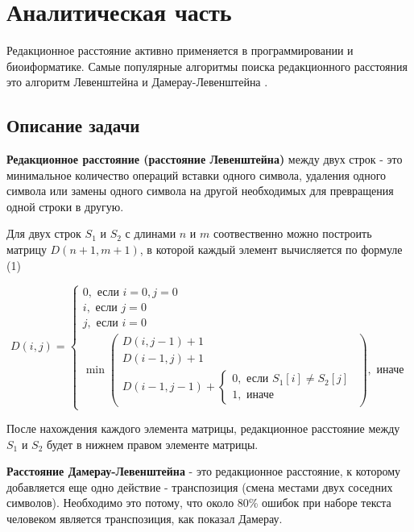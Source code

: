 \newpage
\section{Аналитическая часть}

Редакционное расстояние активно применяется в программировании и биоиформатике.
Самые популярные алгоритмы поиска редакционного расстояния это алгоритм
Левенштейна и Дамерау-Левенштейна \cite{habr}.

\subsection{Описание задачи}

\textbf{Редакционное расстояние (расстояние Левенштейна)}
между двух строк - это
минимальное количество операций вставки одного символа, удаления одного
символа или замены одного символа на другой необходимых для превращения
одной строки в другую. \cite{itmo}

Для двух строк $S_1$ и $S_2$ с длинами $n$ и $m$ соотвественно можно
построить матрицу $D(n+1, m+1)$, в которой каждый элемент вычисляется по формуле (1)
\cite{itmo}

\begin{equation}
D(i,j) =
\begin{cases}
    0, \text{ если } i = 0, j = 0 \\
    i, \text{ если } j = 0 \\
    j, \text{ если } i = 0 \\
    \min
    \left(
        \begin{matrix}
            D(i, j - 1) + 1 \\
            D(i - 1, j) + 1 \\
            D(i - 1, j - 1) +
            \begin{cases}
                0, \text{ если } S_1[i] \ne S_2[j] \\
                1, \text{ иначе}
            \end{cases}
        \end{matrix}
    \right)
    , \text{ иначе}
\end{cases}
\end{equation}

После нахождения каждого элемента матрицы, редакционное расстояние между
$S_1$ и $S_2$ будет в нижнем правом элементе матрицы.

\textbf{Расстояние Дамерау-Левенштейна} - это редакционное расстояние,
к которому добавляется еще одно действие - транспозиция (смена местами
двух соседних символов). Необходимо это потому, что около 80\% ошибок
при наборе текста человеком является транспозиция, как показал Дамерау. \cite{bmstu}


